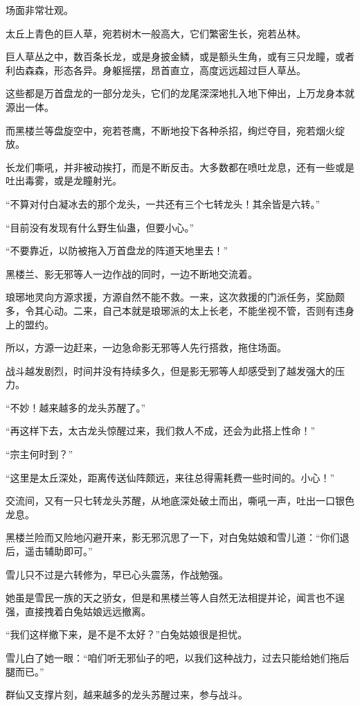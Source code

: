 \begin{this_body}
场面非常壮观。

太丘上青色的巨人草，宛若树木一般高大，它们繁密生长，宛若丛林。

巨人草丛之中，数百条长龙，或是身披金鳞，或是额头生角，或有三只龙瞳，或者利齿森森，形态各异。身躯摇摆，昂首直立，高度远远超过巨人草丛。

这些都是万首盘龙的一部分龙头，它们的龙尾深深地扎入地下伸出，上万龙身本就源出一体。

而黑楼兰等盘旋空中，宛若苍鹰，不断地投下各种杀招，绚烂夺目，宛若烟火绽放。

长龙们嘶吼，并非被动挨打，而是不断反击。大多数都在喷吐龙息，还有一些或是吐出毒雾，或是龙瞳射光。

“不算对付白凝冰去的那个龙头，一共还有三个七转龙头！其余皆是六转。”

“目前没有发现有什么野生仙蛊，但要小心。”

“不要靠近，以防被拖入万首盘龙的阵道天地里去！”

黑楼兰、影无邪等人一边作战的同时，一边不断地交流着。

琅琊地灵向方源求援，方源自然不能不救。一来，这次救援的门派任务，奖励颇多，令其心动。二来，自己本就是琅琊派的太上长老，不能坐视不管，否则有违身上的盟约。

所以，方源一边赶来，一边急命影无邪等人先行搭救，拖住场面。

战斗越发剧烈，时间并没有持续多久，但是影无邪等人却感受到了越发强大的压力。

“不妙！越来越多的龙头苏醒了。”

“再这样下去，太古龙头惊醒过来，我们救人不成，还会为此搭上性命！”

“宗主何时到？”

“这里是太丘深处，距离传送仙阵颇远，来往总得需耗费一些时间的。小心！”

交流间，又有一只七转龙头苏醒，从地底深处破土而出，嘶吼一声，吐出一口银色龙息。

黑楼兰险而又险地闪避开来，影无邪沉思了一下，对白兔姑娘和雪儿道：“你们退后，遥击辅助即可。”

雪儿只不过是六转修为，早已心头震荡，作战勉强。

她虽是雪民一族的天之骄女，但是和黑楼兰等人自然无法相提并论，闻言也不逞强，直接拽着白兔姑娘远远撤离。

“我们这样撤下来，是不是不太好？”白兔姑娘很是担忧。

雪儿白了她一眼：“咱们听无邪仙子的吧，以我们这种战力，过去只能给她们拖后腿而已。”

群仙又支撑片刻，越来越多的龙头苏醒过来，参与战斗。


\end{this_body}
